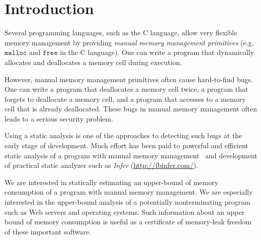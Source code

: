 \section{Introduction}
\label{sec:introduction}

Several programming languages, such as the C language, allow very
flexible memory management by providing \emph{manual memory management
primitives} (e.g. \(\mathtt{malloc}\) and \(\mathtt{free}\) in the C
language).  One can write a program that dynamically allocates and
deallocates a memory cell during execution.

However, manual memory management primitives often cause hard-to-find
bugs.  One can write a program that deallocates a memory cell twice, a
program that forgets to deallocate a memory cell, and a program that
accesses to a memory cell that is already deallocated.  These bugs in
manual memory management often leads to a serious security problem.

Using a static analysis is one of the approaches to detecting such bugs
at the early stage of development.  Much effort has been paid to
powerful and efficient static analysis of a program with manual memory
management~\cite{DBLP:conf/aplas/SuenagaK09,DBLP:conf/pldi/HeineL03,DBLP:conf/sigsoft/XieA05,DBLP:journals/scp/SwamyHMGJ06,DBLP:conf/sas/OrlovichR06,DBLP:conf/issta/SuiYX12}
and development of practical static analyzer such as \emph{Infer}
(\url{http://fbinfer.com/}).

We are interested in statically estimating an upper-bound of memory
consumption of a program with manual memory management.  We are
especially interested in the upper-bound analysis of a potentially
nonterminating program such as Web servers and operating systems.  Such
information about an upper bound of memory consumption is useful as a
certificate of memory-leak freedom of these important software.


